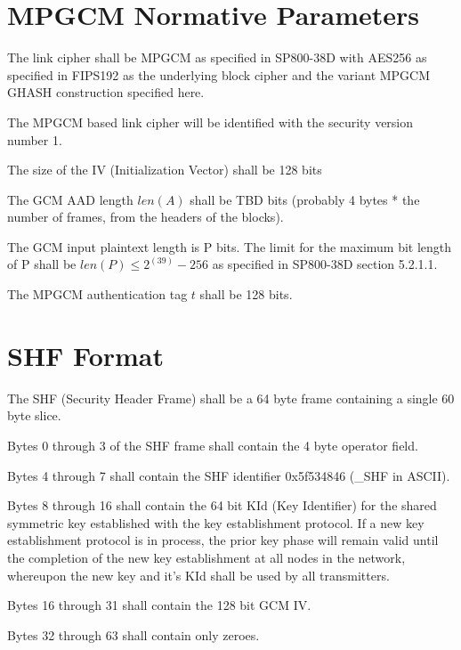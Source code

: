 \documentclass[../../../OAE-SPEC-MAIN.tex]{subfiles}
\begin{document}
\section{MPGCM Normative Parameters}


The link cipher shall be MPGCM as specified in SP800-38D with AES256 as specified in FIPS192 as the underlying block cipher and the variant MPGCM GHASH construction specified here.

The MPGCM based link cipher will be identified with the security version number 1.

The size of the IV (Initialization Vector) shall be 128 bits

The GCM AAD length $len(A)$ shall be TBD bits (probably 4 bytes * the number of frames, from the headers of the blocks).

The GCM input plaintext length is P bits. The limit for the maximum bit length of P shall be $len(P) \leq 2^(39)-256$ as specified in SP800-38D section 5.2.1.1. 

The MPGCM authentication tag $t$ shall be 128 bits. 

\section{SHF Format}

The SHF (Security Header Frame) shall be a 64 byte frame containing a single 60 byte slice.

Bytes 0 through 3 of the SHF frame shall contain the 4 byte operator field.

Bytes 4 through 7 shall contain the SHF identifier 0x5f534846 (_SHF in ASCII).

Bytes 8 through 16 shall contain the 64 bit KId (Key Identifier) for the shared symmetric key established with the key establishment protocol. If a new key establishment protocol is in process, the prior key phase will remain valid until the completion of the new key establishment at all nodes in the network, whereupon the new key and it's KId shall be used by all transmitters.

Bytes 16 through 31 shall contain the 128 bit GCM IV.

Bytes 32 through 63 shall contain only zeroes. 
\end{document}
